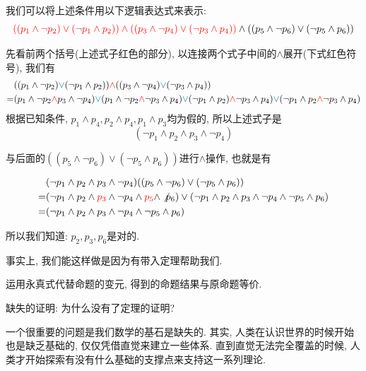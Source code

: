 \begin{sol}
	我们可以将上述条件用以下逻辑表达式来表示:
$$
\textcolor{red}{((p_1\land \lnot p_2)\lor (\lnot p_1\land  p_2))\land ((p_3\land \lnot p_4)\lor (\lnot p_3\land  p_4))}\land ((p_5\land \lnot p_6)\lor (\lnot p_5\land  p_6))
$$

先看前两个括号(上述式子红色的部分), 以连接两个式子中间的$\land$展开(下式红色符号), 我们有
$$
\begin{aligned}
	&((p_1\land \lnot p_2)\textcolor{teal}{\lor} (\lnot p_1\land  p_2))\textcolor{red}{\land} ((p_3\land \lnot p_4)\textcolor{teal}{\lor} (\lnot p_3 \land  p_4)) \\
	=& (p_1\land \lnot p_2 \textcolor{red}{\land} p_3\land \lnot p_4) \textcolor{teal}{\lor} (p_1\land \lnot p_2 \textcolor{red}{\land} \lnot p_3\land  p_4)\textcolor{teal}{\lor} (\lnot p_1\land  p_2)\textcolor{red}{\land}\lnot p_3\land  p_4)\textcolor{teal}{\lor} (\lnot p_1\land  p_2\textcolor{red}{\land}\lnot p_3\land  p_4)
\end{aligned}
$$
根据已知条件, $p_1\land p_4, p_2\land p_4, p_1 \land p_3$均为假的, 所以上述式子是
$$
(\lnot p_1 \land p_2 \land p_3 \land \lnot p_4)
$$

与后面的$((p_5\land \lnot p_6)\lor (\lnot p_5\land  p_6))$进行$\land$操作, 也就是有

$$
\begin{aligned}
	&(\lnot p_1 \land p_2 \land p_3 \land \lnot p_4)((p_5\land \lnot p_6)\lor (\lnot p_5\land  p_6)) \\
	=& (\lnot p_1 \land p_2 \land \textcolor{red}{p_3} \land \lnot p_4 \land\textcolor{red}{ p_5} \land \not p_6)\lor (\lnot p_1 \land p_2 \land p_3 \land \lnot p_4 \land \lnot  p_5 \land p_6) \\
	=&(\lnot p_1 \land p_2 \land p_3 \land \lnot p_4 \land \lnot  p_5 \land p_6)
\end{aligned}
$$

所以我们知道: $p_2, p_3, p_6$是对的. 
\end{sol}

事实上, 我们能这样做是因为有带入定理帮助我们. 

\begin{theorem}[带入定理]
	运用永真式代替命题的变元, 得到的命题结果与原命题等价. 
\end{theorem}

\begin{bonus}
	缺失的证明: 为什么没有了定理的证明? 	
	
	一个很重要的问题是我们数学的基石是缺失的. 其实, 人类在认识世界的时候开始也是缺乏基础的, 仅仅凭借直觉来建立一些体系. 直到直觉无法完全覆盖的时候, 人类才开始探索有没有什么基础的支撑点来支持这一系列理论. 
\end{bonus}

